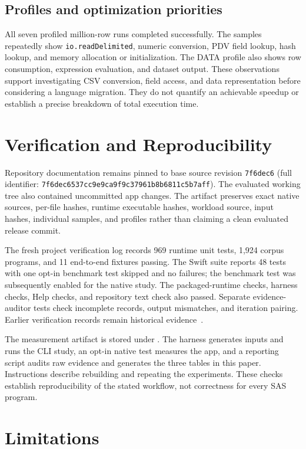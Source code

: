 \documentclass[11pt,a4paper]{article}
\newcommand{\localstatrevision}{7f6dec6537cc9e9ca9f9c37961b8b6811c5b7aff}
\begin{document}
\subsection{Profiles and optimization priorities}

All seven profiled million-row runs completed successfully.
The samples repeatedly show \texttt{io.readDelimited}, numeric
conversion, PDV field lookup, hash lookup, and memory allocation
or initialization. The DATA profile also shows row consumption,
expression evaluation, and dataset output. These observations
support investigating CSV conversion, field access, and data
representation before considering a language migration. They
do not quantify an achievable speedup or establish a precise
breakdown of total execution time.

\section{Verification and Reproducibility}

Repository documentation remains pinned to base source revision
\texttt{7f6dec6} (full identifier:
\texttt{\localstatrevision}). The evaluated working tree also
contained uncommitted app changes. The artifact preserves exact
native sources, per-file hashes, runtime executable hashes,
workload source, input hashes, individual samples, and profiles
rather than claiming a clean evaluated release commit.

The fresh project verification log records 969 runtime unit
tests, 1,924 corpus programs, and 11 end-to-end fixtures passing.
The Swift suite reports 48 tests with one opt-in benchmark test
skipped and no failures; the benchmark test was subsequently
enabled for the native study. The packaged-runtime checks,
harness checks, Help checks, and repository text check also
passed. Separate evidence-auditor tests check incomplete records,
output mismatches, and iteration pairing. Earlier verification
records remain historical evidence~\cite{verification}.

The measurement artifact is stored under
. The harness generates inputs
and runs the CLI study, an opt-in native test measures the app,
and a reporting script audits raw evidence and generates the
three tables in this paper. Instructions describe rebuilding and
repeating the experiments. These checks establish reproducibility
of the stated workflow, not correctness for every SAS program.

\section{Limitations}
\end{document}
